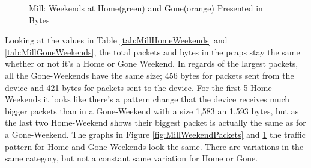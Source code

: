 \begin{figure}[H]
    \begin{subfigure}[b]{0.47\textwidth}
    \end{subfigure}
    \begin{subfigure}[b]{0.47\textwidth}
    \end{subfigure}
   \begin{subfigure}[b]{0.47\textwidth}
    \end{subfigure}
    \hspace{0.6cm}
    \begin{subfigure}[b]{0.47\textwidth}
    \end{subfigure}
    \caption{Mill: Weekends at Home(green) and Gone(orange) Presented in Bytes}
    \label{fig:MillWeekendBytes}
\end{figure}

Looking at the values in Table \ref{tab:MillHomeWeekends} and \ref{tab:MillGoneWeekends}, the total packets and bytes in the pcaps stay the same whether or not it's a Home or Gone Weekend. In regards of the largest packets, all the Gone-Weekends have the same size; 456 bytes for packets sent from the device and 421 bytes for packets sent to the device. For the first 5 Home-Weekends it looks like there's a pattern change that the device receives much bigger packets than in a Gone-Weekend with a size 1,583 an 1,593 bytes, but as the last two Home-Weekend shows their biggest packet is actually the same as for a Gone-Weekend. The graphs in Figure \ref{fig:MillWeekendPackets} and \ref{fig:MillWeekendBytes} the traffic pattern for Home and Gone Weekends look the same. There are variations in the same category, but not a constant same variation for Home or Gone. 

\newpage
